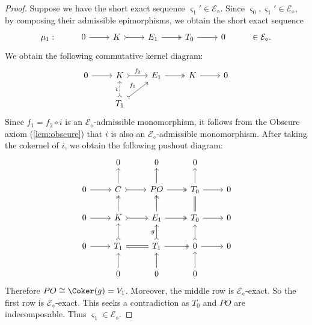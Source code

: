 \begin{proof}
Suppose we have the short exact sequence $\varsigma_1' \in \mathcal{E_\diamond}$. Since $\varsigma_0, \varsigma_1' \in \mathcal{E_\diamond}$, by composing their admissible epimorphisms, we obtain the short exact sequence  \[\begin{tikzcd}
	\mu_1: & 0 & K & E_1 & T_0 &  0 & \in \mathcal{E}_\diamond.
	\arrow[from=1-2, to=1-3]
	\arrow[tail, from=1-3, to=1-4]
	\arrow[two heads,from=1-4, to=1-5]
	\arrow[from=1-5, to=1-6]
\end{tikzcd}\]  We obtain the following commutative kernel diagram:
\[\begin{tikzcd}
	 0 & K & E_1 & K &  0 \\
      & T_1 & & &
	\arrow[from=1-1, to=1-2]
	\arrow[tail,"f_2", from=1-2, to=1-3] 
        \arrow[tail,"f_1",from=2-2, to=1-3]
        \arrow[tail,dashed,"i",from=2-2, to=1-2]
	\arrow[two heads,from=1-3, to=1-4]
	\arrow[from=1-4, to=1-5]
\end{tikzcd}\] 
Since $f_1 = f_2 \circ i$ is an $ \mathcal{E}_\diamond$-admissible monomorphism, it follows from the Obscure axiom (\cref{lem:obscure}) that $i$ is also an $\mathcal{E}_\diamond$-admissible monomorphism. After taking the cokernel of $i$, we obtain the following pushout diagram:
\[\begin{tikzcd}
         & 0 & 0 & 0 &  \\
	0 & C & PO  & T_0 &  0 \\
     0 & K & E_1 & T_0 & 0 \\
      0 & T_1 & T_1 & 0 & 0 \\
       & 0 & 0 & 0 & 
	\arrow[from=2-1, to=2-2]
	\arrow[tail, from=2-2, to=2-3]
	\arrow[two heads,from=2-3, to=2-4]
	\arrow[from=2-4, to=2-5]
        \arrow[from=3-1, to=3-2]
	\arrow[tail, from=3-2, to=3-3]
	\arrow[two heads,from=3-3, to=3-4]
	\arrow[from=3-4, to=3-5]
        \arrow[from=4-1, to=4-2]
	\arrow[equals, from=4-2, to=4-3]
	\arrow[two heads,from=4-3, to=4-4]
	\arrow[from=4-4, to=4-5]
        \arrow[from=5-2, to=4-2]
	\arrow[tail, from=4-2, to=3-2]
	\arrow[two heads,from=3-2, to=2-2]
	\arrow[from=2-2, to=1-2]
        \arrow[from=5-3, to=4-3]
	\arrow[tail,"g", from=4-3, to=3-3]
	\arrow[two heads,from=3-3, to=2-3]
	\arrow[from=2-3, to=1-3]
        \arrow[from=5-4, to=4-4]
	\arrow[tail, from=4-4, to=3-4]
	\arrow[equals,from=3-4, to=2-4]
	\arrow[from=2-4, to=1-4]
\end{tikzcd} \]
Therefore $PO \cong \Coker(g) = V_1 $. Moreover, the middle row is ${\mathcal{E_\diamond}}$-exact. So the first row is ${\mathcal{E_\diamond}}$-exact. This seeks a contradiction as $T_0$ and $PO$ are indecomposable. Thus $\varsigma_1 \in \mathcal{E}_\diamond$.


\end{proof}
